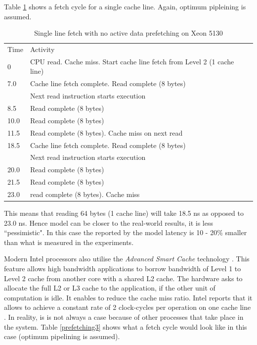 Table \ref{prefetching2} shows a fetch cycle for a single cache line. Again, optimum pipleining is assumed.

\begin{table}[h]
\caption{Single line fetch with no active data prefetching on Xeon 5130}
\begin{tabular}{ll}
Time & Activity                                                                                 \\
0    & CPU read. Cache miss. Start cache line fetch from Level 2 (1 cache line)                        \\
7.0  & Cache line fetch complete. Read complete (8 bytes)\\
 & Next read instruction starts execution \\
8.5  & Read complete (8 bytes)                                                                  \\
10.0 & Read complete (8 bytes)                                                                  \\
11.5 & Read complete (8 bytes). Cache miss on next read                                          \\
18.5 & Cache line fetch complete. Read complete (8 bytes)\\
 & Next read instruction starts execution \\
20.0 & Read complete (8 bytes)                                                                  \\
21.5 & Read complete (8 bytes)                                                                  \\
23.0 & read complete (8 bytes). Cache miss                                                  
\end{tabular}
\label{prefetching2}
\end{table}

This means that reading 64 bytes (1 cache line) will take 18.5 ns as opposed to 23.0 ns. Hence model can be closer to the real-world results, it is less ``pessimistic". In this case the reported by the model latency is 10 - 20\% smaller than what is measured in the experiments.

Modern Intel processors also utilise the \textit{Advanced Smart Cache} technology \cite{Doweck2006}. This feature allows high bandwidth applications to borrow bandwidth of Level 1 to Level 2 cache from another core with a shared L2 cache. The hardware asks to allocate the full L2 or L3 cache to the application, if the other unit of computation is idle. It enables to reduce the cache miss ratio. Intel reports that it allows to achieve a constant rate of 2 clock-cycles per operation on one cache line \cite{Doweck}. In reality, is is not always a case because of other processes that take place in the system. Table \ref{prefetching3} shows what a fetch cycle would look like in this case (optimum pipelining is assumed).

